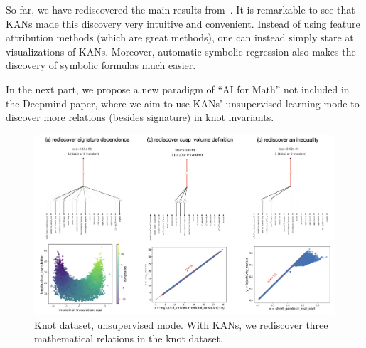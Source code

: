 \documentclass{article}
\numberwithin{equation}{section}
\numberwithin{figure}{section}
\newcommand{\zm}[1]{{\color{black!0!blue} #1}}
\newcommand{\todo}[1]{{\color{black!0!blue} #1}}
\begin{document}
So far, we have rediscovered the main results from~\cite{davies2021advancing}. It is remarkable to see that KANs made this discovery very intuitive and convenient. Instead of using feature attribution methods (which are great methods), one can instead simply stare at visualizations of KANs. Moreover, automatic symbolic regression also makes the discovery of symbolic formulas much easier. 

In the next part, we propose a new paradigm of ``AI for Math'' not included in the Deepmind paper, where we aim to use KANs' unsupervised learning mode to discover more relations (besides signature) in knot invariants.







\begin{figure}[t]
    \centering\includegraphics[width=1.0\linewidth]{figs/knot_unsupervised.png}
    \caption{Knot dataset, unsupervised mode. With KANs, we rediscover three mathematical relations in the knot dataset.}
    \label{fig:knot-unsupervised}
\end{figure}
\end{document}
